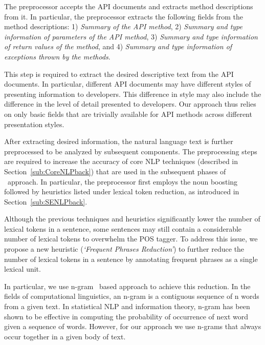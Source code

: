 The preprocessor accepts the API documents and extracts method descriptions from it.
In particular, the preprocessor extracts the following fields from the method descriptions: 
1) \textit{Summary of the API method},
2) \textit{Summary and type information of parameters of the API method}, 
3) \textit{Summary and type information of return values of the method}, and
4) \textit{Summary and type information of exceptions thrown by the methods}.

This step is required to extract the desired descriptive text from the API documents.
In particular, different API documents may have different styles of presenting information to developers.
This difference in style may also include the difference in the level of detail presented to developers.
Our approach thus relies on only basic fields that are trivially available for API methods across different presentation styles. 

After extracting desired information, the natural language text is further preprocessed to be analyzed by subsequent components.
The preprocessing steps are required to increase the accuracy of core NLP techniques (described in Section~\ref{sub:CoreNLPback}) that are used in the subsequent phases of \tool\ approach.
In particular, the preprocessor first employs the noun boosting followed by heuristics listed under lexical token reduction, as introduced in Section~\ref{sub:SENLPback}.

Although the previous techniques and heuristics significantly lower the number of lexical tokens in a sentence,
some sentences may still contain a considerable number of lexical tokens to overwhelm the POS tagger.
To address this issue, we propose a new heuristic (\textit{`Frequent Phrases Reduction'})
to further reduce the number of lexical tokens in a sentence by annotating frequent phrases as a single lexical unit.

In particular, we use n-gram~\cite{brown1992class} based approach to achieve this reduction. 
In the fields of computational linguistics, an n-gram is a contiguous sequence of n words from a given text.
In statistical NLP  and information theory, n-gram has been shown to be effective in computing the probability of occurrence of next word given a sequence of words.
However, for our approach we use n-grams that always occur together in a given body of text.


